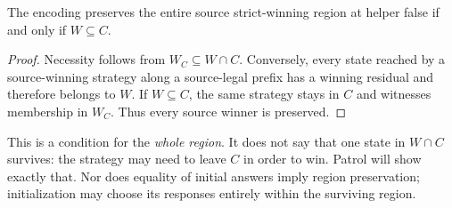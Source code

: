 \begin{corollary}\label{hpb:full-preservation}
The encoding preserves the entire source strict-winning region at helper
false if and only if $W\subseteq C$.
\end{corollary}
\begin{proof}
Necessity follows from $W_C\subseteq W\cap C$. Conversely, every state
reached by a source-winning strategy along a source-legal prefix has a
winning residual and therefore belongs to $W$. If $W\subseteq C$, the
same strategy stays in $C$ and witnesses membership in $W_C$.
Thus every source winner is preserved.
\end{proof}
This is a condition for the \emph{whole region}. It does not say that
one state in $W\cap C$ survives: the strategy may need to leave $C$ in
order to win. Patrol will show exactly that. Nor does equality of initial
answers imply region preservation; initialization may choose its responses
entirely within the surviving region.
